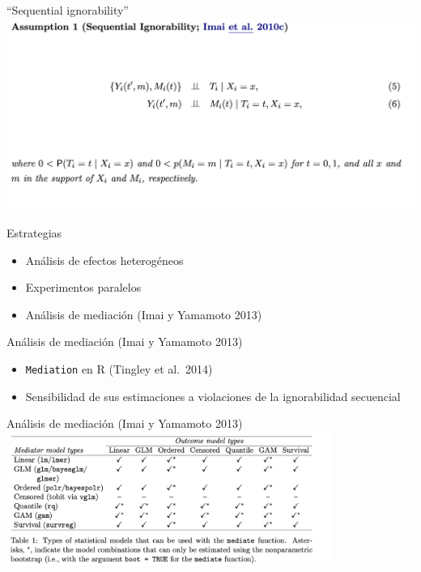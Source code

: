 \documentclass[
  ignorenonframetext,
]{beamer}
\providecommand{\tightlist}{%
  \setlength{\itemsep}{0pt}\setlength{\parskip}{0pt}}
\begin{document}
\begin{frame}{``Sequential ignorability''}
\protect\hypertarget{sequential-ignorability-1}{}
\center \includegraphics[width=1\textwidth,height=\textheight]{figs/seq}
\end{frame}

\begin{frame}{Estrategias}
\protect\hypertarget{estrategias}{}
\begin{itemize}[<+->]
\tightlist
\item
  Análisis de efectos heterogéneos
\item
  Experimentos paralelos
\item
  Análisis de mediación (Imai y Yamamoto 2013)
\end{itemize}
\end{frame}

\begin{frame}{Análisis de mediación (Imai y Yamamoto 2013)}
\protect\hypertarget{anuxe1lisis-de-mediaciuxf3n-imai-y-yamamoto-2013}{}
\begin{itemize}
\tightlist
\item
  \texttt{Mediation} en R (Tingley et al.~2014)
\item
  Sensibilidad de sus estimaciones a violaciones de la ignorabilidad
  secuencial
\end{itemize}
\end{frame}

\begin{frame}{Análisis de mediación (Imai y Yamamoto 2013)}
\protect\hypertarget{anuxe1lisis-de-mediaciuxf3n-imai-y-yamamoto-2013-1}{}
\center \includegraphics[width=0.8\textwidth,height=\textheight]{figs/models}
\end{frame}
\end{document}
